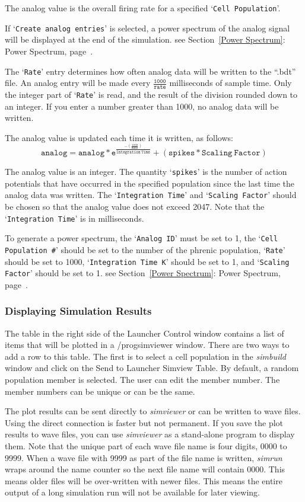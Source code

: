 \documentclass[12pt,openany,oneside]{book}
\newcommand{\tmcode}[1]{\mathtt{#1}}
\newcommand{\tisamp}[1]{`\texttt{#1}'}
\newcommand{\tixref}[1]{see Section~\ref{#1}: #1, page~\pageref{#1}}
\newcommand{\prog}[1]{\textit{{#1}}}
\newcommand{\ext}[1]{{{``.#1''}}}
\begin{document}
The analog value is the overall firing rate for a specified \tisamp{Cell
Population}.

If \tisamp{Create analog entries} is selected, a power spectrum of the
analog signal will be displayed at the end of the simulation.
\tixref{Power Spectrum}.

The \tisamp{Rate} entry determines how often analog data will be written
to the \ext{bdt} file. An analog entry will be made every
$\tmcode{\tfrac{1000}{rate}}$ milliseconds of sample time. Only the integer
part of \tisamp{Rate} is read, and the result of the division rounded down
to an integer. If you enter a number greater than 1000, no analog data
will be written.

The analog value is updated each time it is written, as follows:
$$
\tmcode{ analog = analog * e^{\tfrac{-{\left (\tfrac{1000}{Rate}\right
)}}{Integration\ Time}} + (spikes * Scaling\ Factor)}
$$

The analog value is an integer. The
quantity \tisamp{spikes} is the number of action potentials that have
occurred in the specified population since the last time the analog
data was written. The \tisamp{Integration Time} and \tisamp{Scaling
Factor} should be chosen so that the analog value does not exceed
2047. Note that the \tisamp{Integration Time} is in milliseconds.

To generate a power spectrum, the \tisamp{Analog ID} must be set to 1,
the \tisamp{Cell Population \#} should be set to the number of the
phrenic population, \tisamp{Rate} should be set to 1000,
\tisamp{Integration Time K} should be set to 1, and \tisamp{Scaling
Factor} should be set to 1. \tixref{Power Spectrum}.

\subsubsection{Displaying Simulation Results}

The table in the right side of the Launcher Control window contains a list
of items that will be plotted in a /prog{simviewer} window. There are two
ways to add a row to this table. The first is to select a cell population
in the \prog{simbuild} window and click on the Send to Launcher Simview
Table.  By default, a random population member is selected. The user can
edit the member number. The member numbers can be unique or can be the
same.

The plot results can be sent directly to \prog{simviewer} or can be
written to wave files. Using the direct connection is faster but not
permanent. If you save the plot results to wave files, you can use
\prog{simviewer} as a stand-alone program to display them. Note that 
the unique part of each wave file name is four digits, 0000 to 9999. When
a wave file with 9999 as part of the file name is written, \prog{simrun}
wraps around the name counter so the next file name will contain 0000.
This means older files will be over-written with newer files. This means
the entire output of a long simulation run will not be available for later
viewing.
\end{document}

